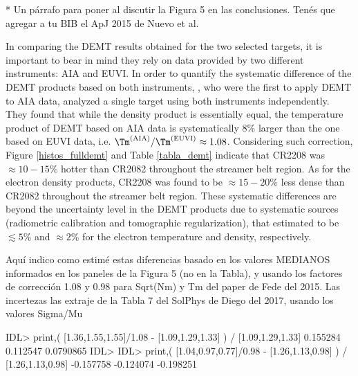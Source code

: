
* Un párrafo para poner al discutir la Figura 5 en las conclusiones. Tenés que agregar a tu BIB el ApJ 2015 de Nuevo et al.

In comparing the DEMT results obtained for the two selected targets, it is important to bear in mind they rely on data provided by two different instruments: AIA and EUVI. In order to quantify the systematic difference of the DEMT products based on both instruments, \citet{nuevo_2015}, who were the first to apply DEMT to AIA data, analyzed a single target using both instruments independently. They found that while the density product is essentially equal, the temperature product of DEMT based on AIA data is systematically 8\% larger than the one based on EUVI data, i.e. $\Tm^{\rm(AIA)}/\Tm^{\rm(EUVI)} \approx 1.08$. Considering such correction, Figure \ref{histos_fulldemt} and Table \ref{tabla_demt} indicate that CR2208 was $\approx 10-15\%$ hotter than CR2082 throughout the streamer belt region. As for the electron density products, CR2208 was found to be $\approx 15-20\%$ less dense than CR2082 throughout the streamer belt region. These systematic differences are beyond the uncertainty level in the DEMT products due to systematic sources (radiometric calibration and tomographic regularization), that \citet{lloveras_2017} estimated to be $\lesssim 5\%$ and $\approx 2\%$ for the electron temperature and density, respectively.

Aquí indico como estimé estas diferencias basado en los valores MEDIANOS informados en los paneles de la Figura 5 (no en la Tabla), y usando los factores de corrección 1.08 y 0.98 para Sqrt(Nm) y Tm del paper de Fede del 2015. Las incertezas las extraje de la Tabla 7 del SolPhys de Diego del 2017, usando los valores Sigma/Mu

IDL> print,( [1.36,1.55,1.55]/1.08 - [1.09,1.29,1.33] ) / [1.09,1.29,1.33]
     0.155284     0.112547    0.0790865
IDL> 
IDL> print,( [1.04,0.97,0.77]/0.98 - [1.26,1.13,0.98] ) / [1.26,1.13,0.98]
    -0.157758    -0.124074    -0.198251

